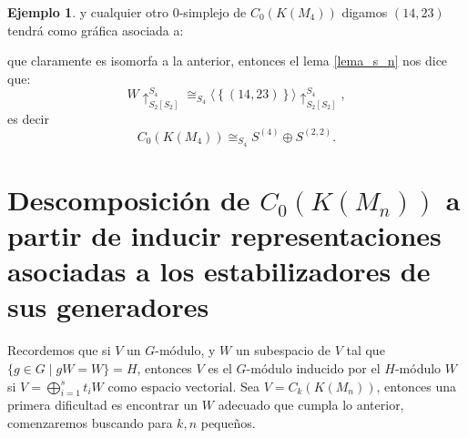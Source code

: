 \documentclass[12pt]{book}
\theoremstyle{definition}
\newtheorem{example}[theorem]{Ejemplo}
\newcounter{in}
\begin{document}
\begin{example}
y cualquier otro $0$-simplejo de $C_{0}(K(M_{4}))$ digamos $(14,23)$ tendrá como gráfica asociada a:
\begin{center}
\end{center}
que claramente es isomorfa a la anterior, entonces el lema \ref{lema_s_n} nos dice que:
\begin{equation}
W \uparrow_{S_{2} \left [ S_{2} \right ]}^{S_{4}} \cong_{S_{4}} \langle \left \{ (14,23) \right \} \rangle \uparrow_{S_{2} \left [ S_{2} \right ]}^{S_{4}},
\end{equation}
es decir
\begin{equation}
C_{0}(K(M_{4})) \cong_{S_{4}} S^{(4)} \oplus S^{(2,2)}.
\end{equation}
\end{example}

\section{Descomposición de $C_{0}(K(M_n))$ a partir de inducir representaciones asociadas a los estabilizadores de sus generadores}

\label{Ind_est_z}
Recordemos que si $V$ un $G$-módulo, y $W$ un subespacio de $V$ tal que $\{g\in
  G\mid gW=W\}=H$, entonces $V$ es el $G$-módulo inducido por el $H$-módulo $W$ si
  $V=\bigoplus^{s}_{i=1}t_{i}W$ como espacio vectorial. Sea $V = C_{k}(K(M_n))$, entonces una primera dificultad es encontrar un $W$ adecuado que cumpla lo anterior, comenzaremos buscando para $k,n$ pequeños.  
  
\end{document}
